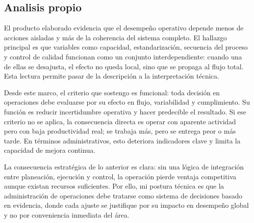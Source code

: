 \documentclass[
	spanish,
	letterpaper, oneside
]{article}
\begin{document}
%

\subsection{Analisis propio}

El producto elaborado evidencia que el desempeño operativo depende menos de acciones aisladas y más de la coherencia del sistema completo. El hallazgo principal es que variables como capacidad, estandarización, secuencia del proceso y control de calidad funcionan como un conjunto interdependiente: cuando una de ellas se desajusta, el efecto no queda local, sino que se propaga al flujo total. Esta lectura permite pasar de la descripción a la interpretación técnica.

Desde este marco, el criterio que sostengo es funcional: toda decisión en operaciones debe evaluarse por su efecto en flujo, variabilidad y cumplimiento. Su función es reducir incertidumbre operativa y hacer predecible el resultado. Si ese criterio no se aplica, la consecuencia directa es operar con aparente actividad pero con baja productividad real; se trabaja más, pero se entrega peor o más tarde. En términos administrativos, esto deteriora indicadores clave y limita la capacidad de mejora continua.

La consecuencia estratégica de lo anterior es clara: sin una lógica de integración entre planeación, ejecución y control, la operación pierde ventaja competitiva aunque existan recursos suficientes. Por ello, mi postura técnica es que la administración de operaciones debe tratarse como sistema de decisiones basado en evidencia, donde cada ajuste se justifique por su impacto en desempeño global y no por conveniencia inmediata del área.
\end{document}
